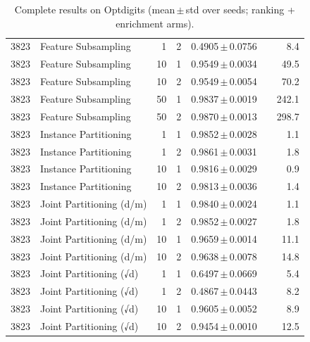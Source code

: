 \begin{table}[ht]
\begin{tabular}{rlrrccr}
3823 & Feature Subsampling & 1 & 2 & 0.4905\,$\pm$\,0.0756 &  & 8.4 \\
3823 & Feature Subsampling & 10 & 1 & 0.9549\,$\pm$\,0.0034 &  & 49.5 \\
3823 & Feature Subsampling & 10 & 2 & 0.9549\,$\pm$\,0.0054 &  & 70.2 \\
3823 & Feature Subsampling & 50 & 1 & 0.9837\,$\pm$\,0.0019 &  & 242.1 \\
3823 & Feature Subsampling & 50 & 2 & 0.9870\,$\pm$\,0.0013 &  & 298.7 \\
3823 & Instance Partitioning & 1 & 1 & 0.9852\,$\pm$\,0.0028 &  & 1.1 \\
3823 & Instance Partitioning & 1 & 2 & 0.9861\,$\pm$\,0.0031 &  & 1.8 \\
3823 & Instance Partitioning & 10 & 1 & 0.9816\,$\pm$\,0.0029 &  & 0.9 \\
3823 & Instance Partitioning & 10 & 2 & 0.9813\,$\pm$\,0.0036 &  & 1.4 \\
3823 & Joint Partitioning (d/m) & 1 & 1 & 0.9840\,$\pm$\,0.0024 &  & 1.1 \\
3823 & Joint Partitioning (d/m) & 1 & 2 & 0.9852\,$\pm$\,0.0027 &  & 1.8 \\
3823 & Joint Partitioning (d/m) & 10 & 1 & 0.9659\,$\pm$\,0.0014 &  & 11.1 \\
3823 & Joint Partitioning (d/m) & 10 & 2 & 0.9638\,$\pm$\,0.0078 &  & 14.8 \\
3823 & Joint Partitioning (√d) & 1 & 1 & 0.6497\,$\pm$\,0.0669 &  & 5.4 \\
3823 & Joint Partitioning (√d) & 1 & 2 & 0.4867\,$\pm$\,0.0443 &  & 8.2 \\
3823 & Joint Partitioning (√d) & 10 & 1 & 0.9605\,$\pm$\,0.0052 &  & 8.9 \\
3823 & Joint Partitioning (√d) & 10 & 2 & 0.9454\,$\pm$\,0.0010 &  & 12.5 \\
\bottomrule
\end{tabular}
\caption{Complete results on Optdigits (mean\,$\pm$\,std over seeds; ranking + enrichment arms).}
\label{tab:app_optdigits}
\end{table}
